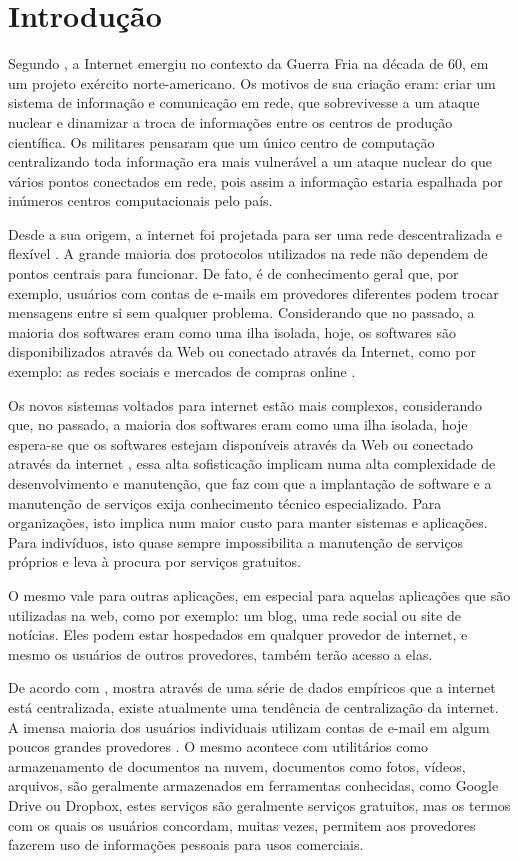 \chapter{Introdução}
\label{cap-introducao}

Segundo \cite{giles2010psychology}, a Internet emergiu no contexto da Guerra Fria na década
de 60, em um projeto exército norte-americano. Os motivos de sua criação eram:
criar um sistema de informação e comunicação em rede, que
sobrevivesse a um ataque nuclear e dinamizar a troca de informações entre os centros de
produção científica. Os militares pensaram que um único centro de computação
centralizando toda informação era mais vulnerável a um ataque nuclear do que vários
pontos conectados em rede, pois assim a informação estaria espalhada por inúmeros
centros computacionais pelo país.

Desde a sua origem, a internet foi projetada para ser uma rede
descentralizada e flexível \cite{galaxia}. A grande maioria dos protocolos 
utilizados na rede não dependem de pontos centrais para funcionar. 
De fato, é de conhecimento geral
que, por exemplo, usuários com contas de e-mails em provedores diferentes podem
trocar mensagens entre si sem qualquer problema. Considerando que no
passado, a maioria dos softwares eram como uma ilha isolada,
hoje, os softwares são disponibilizados através da Web ou conectado através da Internet,
como por exemplo: as redes sociais e mercados de compras online \cite{6265084}.

Os novos sistemas voltados para internet estão mais complexos, considerando que,
no passado, a maioria dos softwares eram
como uma ilha isolada, hoje espera-se que os softwares estejam disponíveis 
através da Web ou conectado através da internet \cite{byhand},
essa alta sofisticação implicam numa alta complexidade de
desenvolvimento e manutenção, que faz com que a
implantação de software e a manutenção de serviços exija conhecimento técnico
especializado. Para organizações, isto implica num maior
custo para manter sistemas e aplicações. Para indivíduos, isto quase sempre
impossibilita a manutenção de serviços próprios e leva à procura por serviços
gratuitos.

O mesmo vale para outras aplicações, em especial para aquelas aplicações
que são utilizadas na web, como por exemplo: um blog, uma rede social ou site de
notícias. Eles podem estar hospedados em qualquer provedor de internet, e mesmo os
usuários de outros provedores, também terão acesso a elas.

De acordo com \cite{vaz}, mostra através de uma série de dados empíricos que
a internet está centralizada, existe atualmente uma tendência de centralização da internet.
A imensa maioria dos usuários individuais utilizam contas de e-mail em algum
poucos grandes provedores \cite{shak2015}. O mesmo acontece com utilitários como armazenamento
de documentos na nuvem, documentos como fotos, vídeos, arquivos, são geralmente
armazenados em ferramentas conhecidas, como Google Drive ou Dropbox, estes serviços 
são geralmente serviços gratuitos, mas os termos com os quais os usuários concordam, 
muitas vezes, permitem aos provedores fazerem uso de informações pessoais para usos comerciais.

